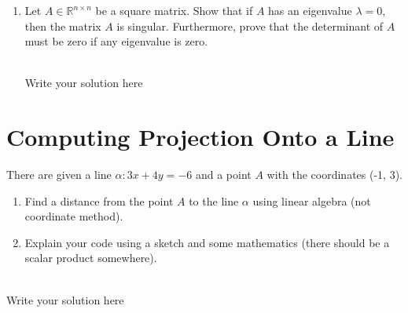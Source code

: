 \documentclass[a4paper]{article}
\begin{document}
\begin{enumerate}
	      \hrulefill \\
	      Write your solution here

       \item Let \( A \in \mathbb{R}^{n \times n} \) be a square matrix. Show that if \( A \) has an eigenvalue \( \lambda = 0 \), then the matrix \( A \)  is singular. Furthermore, prove that the determinant of \( A \) must be zero if any eigenvalue is zero.

       \hrulefill \\
	      Write your solution here
\end{enumerate}

\clearpage
\section{Computing Projection Onto a Line}
There are given a line $\alpha : 3x + 4y = -6$ and a point $A$ with the coordinates (-1, 3).
\begin{enumerate}
	\item Find a distance from the point $A$ to the line $\alpha$ using linear algebra (not coordinate method).
	\item Explain your code using a sketch and some mathematics (there should be a scalar product somewhere).
\end{enumerate}

\hrulefill \\
Write your solution here


% 
% 
\end{document}
